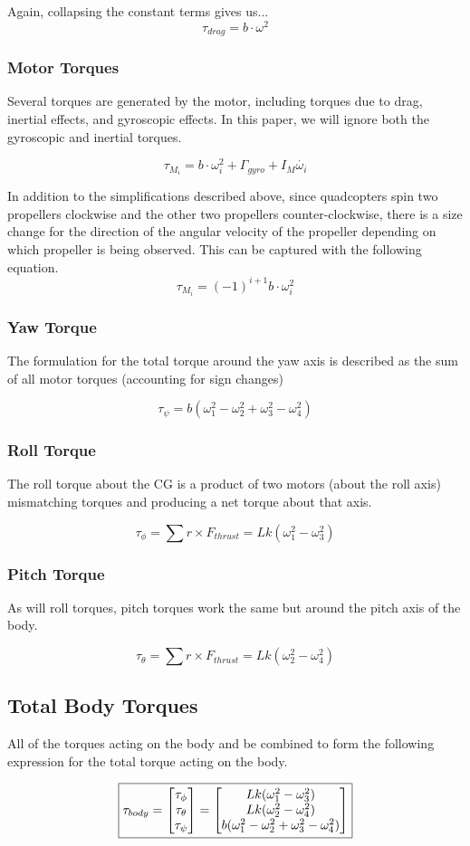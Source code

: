 Again, collapsing the constant terms gives us... 
$$\tau_{drag} = b\cdot \omega^2$$


\subsubsection{Motor Torques}

Several torques are generated by the motor, including torques due to drag, inertial effects, and gyroscopic effects. In this paper, we will ignore both the gyroscopic and inertial torques.

$$\tau_{M_{i}} = b\cdot\omega_{i}^{2} + \Gamma_{gyro} +I_{M}\dot{\omega_{i}}$$


In addition to the simplifications described above, since quadcopters spin two propellers clockwise and the other two propellers counter-clockwise, there is a size change for the direction of the angular velocity of the propeller depending on which propeller is being observed. This can be captured with the following equation. 
$$\tau_{M_{i}} = (-1)^{i+1} b\cdot\omega_{i}^{2}$$

\subsubsection{Yaw Torque}
The formulation for the total torque around the yaw axis is described as the sum of all motor torques (accounting for sign changes)

$$\tau_{\psi} = b(\omega_{1}^{2}- \omega_{2}^{2} + \omega_{3}^{2} - \omega_{4}^{2})$$

\subsubsection{Roll Torque}
The roll torque about the CG is a product of two motors (about the roll axis) mismatching torques and producing a net torque about that axis. 


$$\tau_{\phi} = \sum r \times F_{thrust} = Lk(\omega_{1}^{2} - \omega_{3}^{2})$$


\subsubsection{Pitch Torque}
As will roll torques, pitch torques work the same but around the pitch axis of the body.

$$\tau_{\theta} = \sum r \times F_{thrust} = Lk(\omega_{2}^{2} - \omega_{4}^{2})$$

\subsection{Total Body Torques}

All of the torques acting on the body and be combined to form the following expression for the total torque acting on the body. 

$$\boxed{\tau_{body} = \begin{bmatrix} \tau_{\phi} \\ \tau_{\theta} \\ \tau_{\psi} \end{bmatrix} = \begin{bmatrix} Lk(\omega_{1}^{2} - \omega_{3}^{2}) \\ Lk(\omega_{2}^{2} - \omega_{4}^{2}) \\ b(\omega_{1}^{2}- \omega_{2}^{2} + \omega_{3}^{2} - \omega_{4}^{2}) \end{bmatrix}}$$